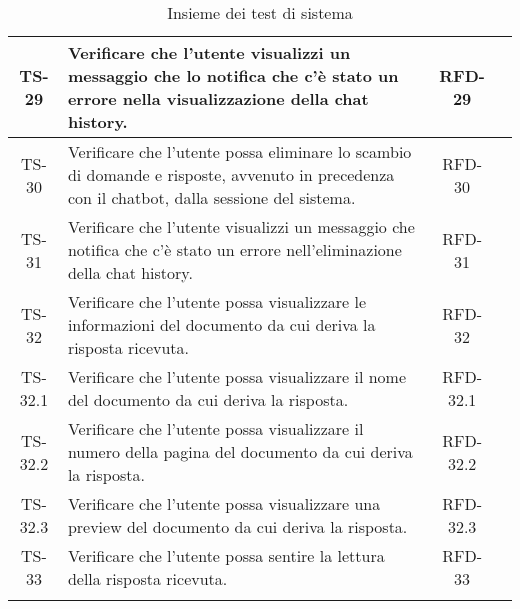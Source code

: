 \begin{xltabular}{\textwidth}{| c | X | c | c |}
    \hline
    TS-29 & Verificare che l'utente visualizzi un messaggio che lo notifica che c'è stato un errore nella visualizzazione della chat history. & RFD-29 & \textcolor{xmarkcolor}{} \\
    \hline
    TS-30 & Verificare che l'utente possa eliminare lo scambio di domande e risposte, avvenuto in precedenza con il chatbot, dalla sessione del sistema. & RFD-30 & \textcolor{xmarkcolor}{} \\
    \hline
    TS-31 & Verificare che l'utente visualizzi un messaggio che notifica che c'è stato un errore nell'eliminazione della chat history. & RFD-31 & \textcolor{xmarkcolor}{} \\
    \hline
    TS-32 & Verificare che l'utente possa visualizzare le informazioni del documento da cui deriva la risposta ricevuta. & RFD-32 & \textcolor{xmarkcolor}{} \\
    \hline
    TS-32.1 & Verificare che l'utente possa visualizzare il nome del documento da cui deriva la risposta. & RFD-32.1 & \textcolor{xmarkcolor}{} \\
    \hline
    TS-32.2 & Verificare che l'utente possa visualizzare il numero della pagina del documento da cui deriva la risposta. & RFD-32.2 & \textcolor{xmarkcolor}{} \\
    \hline
    TS-32.3 & Verificare che l'utente possa visualizzare una preview del documento da cui deriva la risposta. & RFD-32.3 & \textcolor{xmarkcolor}{} \\
    \hline
    TS-33 & Verificare che l'utente possa sentire la lettura della risposta ricevuta. & RFD-33 & \textcolor{xmarkcolor}{} \\
    \hline
     \caption{Insieme dei test di sistema}
    \label{tab:test}
\end{xltabular}
\endgroup

